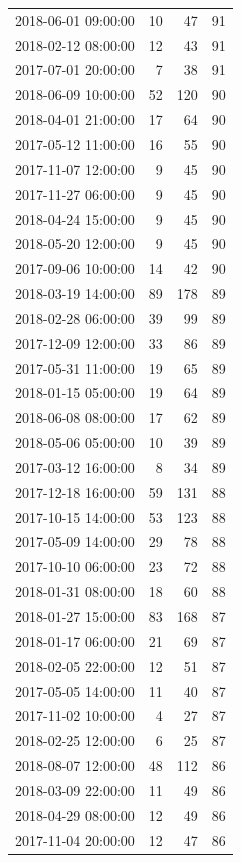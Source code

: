 \begin{tabular}{lrrr}
2018-06-01 09:00:00 & 10 & 47 & 91 \\
2018-02-12 08:00:00 & 12 & 43 & 91 \\
2017-07-01 20:00:00 & 7 & 38 & 91 \\
2018-06-09 10:00:00 & 52 & 120 & 90 \\
2018-04-01 21:00:00 & 17 & 64 & 90 \\
2017-05-12 11:00:00 & 16 & 55 & 90 \\
2017-11-07 12:00:00 & 9 & 45 & 90 \\
2017-11-27 06:00:00 & 9 & 45 & 90 \\
2018-04-24 15:00:00 & 9 & 45 & 90 \\
2018-05-20 12:00:00 & 9 & 45 & 90 \\
2017-09-06 10:00:00 & 14 & 42 & 90 \\
2018-03-19 14:00:00 & 89 & 178 & 89 \\
2018-02-28 06:00:00 & 39 & 99 & 89 \\
2017-12-09 12:00:00 & 33 & 86 & 89 \\
2017-05-31 11:00:00 & 19 & 65 & 89 \\
2018-01-15 05:00:00 & 19 & 64 & 89 \\
2018-06-08 08:00:00 & 17 & 62 & 89 \\
2018-05-06 05:00:00 & 10 & 39 & 89 \\
2017-03-12 16:00:00 & 8 & 34 & 89 \\
2017-12-18 16:00:00 & 59 & 131 & 88 \\
2017-10-15 14:00:00 & 53 & 123 & 88 \\
2017-05-09 14:00:00 & 29 & 78 & 88 \\
2017-10-10 06:00:00 & 23 & 72 & 88 \\
2018-01-31 08:00:00 & 18 & 60 & 88 \\
2018-01-27 15:00:00 & 83 & 168 & 87 \\
2018-01-17 06:00:00 & 21 & 69 & 87 \\
2018-02-05 22:00:00 & 12 & 51 & 87 \\
2017-05-05 14:00:00 & 11 & 40 & 87 \\
2017-11-02 10:00:00 & 4 & 27 & 87 \\
2018-02-25 12:00:00 & 6 & 25 & 87 \\
2018-08-07 12:00:00 & 48 & 112 & 86 \\
2018-03-09 22:00:00 & 11 & 49 & 86 \\
2018-04-29 08:00:00 & 12 & 49 & 86 \\
2017-11-04 20:00:00 & 12 & 47 & 86 \\

\end{tabular}
